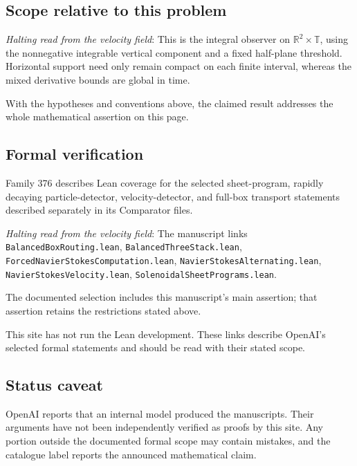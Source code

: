 \documentclass[11pt]{article}
\begin{document}
\subsection{Scope relative to this problem}
\textit{Halting read from the velocity field}: This is the integral observer on $\mathbb R^2\times\mathbb T$, using the nonnegative integrable vertical component and a fixed half-plane threshold. Horizontal support need only remain compact on each finite interval, whereas the mixed derivative bounds are global in time.

With the hypotheses and conventions above, the claimed result addresses the whole mathematical assertion on this page.

\subsection{Formal verification}
Family 376 describes Lean coverage for the selected sheet-program, rapidly decaying particle-detector, velocity-detector, and full-box transport statements described separately in its Comparator files.

\textit{Halting read from the velocity field}: The manuscript links \texttt{BalancedBoxRouting.lean}, \texttt{BalancedThreeStack.lean}, \texttt{ForcedNavierStokesComputation.lean}, \texttt{NavierStokesAlternating.lean}, \texttt{NavierStokesVelocity.lean}, \texttt{SolenoidalSheetPrograms.lean}.

The documented selection includes this manuscript’s main assertion; that assertion retains the restrictions stated above.

This site has not run the Lean development. These links describe OpenAI’s selected formal statements and should be read with their stated scope.

\subsection{Status caveat}
OpenAI reports that an internal model produced the manuscripts. Their arguments have not been independently verified as proofs by this site. Any portion outside the documented formal scope may contain mistakes, and the catalogue label reports the announced mathematical claim.
\end{document}
